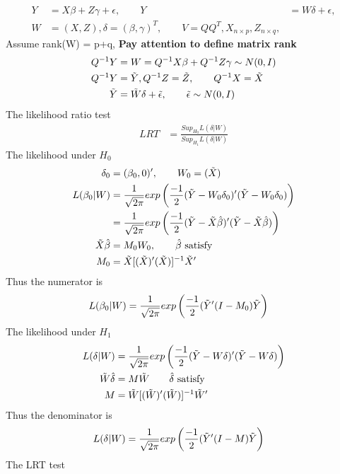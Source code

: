 \documentclass{article}
\begin{document}
\begin{itemize}
\begin{align*}
Y &= X\beta + Z\gamma + \epsilon, \qquad Y&= W\delta + \epsilon, \\
W &= (X, Z), \delta = (\beta, \gamma)^T, \qquad V = Q Q^{T}, X_{n \times p}, Z_{n \times q}, 
\end{align*}
Assume rank(W) = p+q, \textbf{Pay attention to define matrix rank}
\begin{align*}
Q^{-1}Y &= W = Q^{-1}X \beta + Q^{-1}Z \gamma \sim N(0, I) \\
Q^{-1}Y &= \Tilde{Y}, Q^{-1}Z = \Tilde{Z}, \qquad Q^{-1}X = \Tilde{X}\\
\Tilde{Y} &= \Tilde{W} \delta + \Tilde{\epsilon},  \qquad \Tilde{\epsilon} \sim N(0,I)
\end{align*}
The likelihood ratio test
\begin{align*}
LRT &= \frac{Sup_{H_0} L(\delta| W)}{Sup_{H_1}L(\delta| W)} 
\end{align*}
The likelihood under $H_0$
\begin{align*}
\delta_0 &= (\beta_0, 0)', \qquad W_0 = (\Tilde{X}) \\
L(\beta_0|W) &=\frac{1}{\sqrt{2\pi}} exp \left(\frac{-1}{2} (\Tilde{Y} - W_0\delta_0)'(\Tilde{Y} - W_0\delta_0) \right) \\
&= \frac{1}{\sqrt{2\pi}} exp \left(\frac{-1}{2} (\Tilde{Y} - \Tilde{X}\hat{\beta})'(\Tilde{Y} - \Tilde{X}\hat{\beta}) \right)\\
\Tilde{X}\hat{\beta} &= M_0 W_0, \qquad \hat{\beta} \text{ satisfy}\\
M_0 &= \Tilde{X}[(\Tilde{X})'(\Tilde{X})]^{-1}\Tilde{X}' 
\end{align*}
Thus the numerator is 
\begin{align*}
L(\beta_0|W) &= \frac{1}{\sqrt{2\pi}} exp \left(\frac{-1}{2} (\Tilde{Y}' (I- M_0) \Tilde{Y} \right)
\end{align*}
The likelihood under $H_1$
\begin{align*}
L(\delta|W) &=\frac{1}{\sqrt{2\pi}} exp \left(\frac{-1}{2} (\Tilde{Y} - W\delta)'(\Tilde{Y} - W\delta) \right)\\
\Tilde{W} \hat{\delta} &= M \Tilde{W} \qquad \hat{\delta} \text{ satisfy}\\
M &= \Tilde{W}[(\Tilde{W})'(\Tilde{W})]^{-1}\Tilde{W}' 
\end{align*}
Thus the denominator is 
\begin{align*}
L(\delta|W) &= \frac{1}{\sqrt{2\pi}} exp \left(\frac{-1}{2} (\Tilde{Y}' (I- M) \Tilde{Y} \right)
\end{align*}
The LRT test 
\begin{align*}

\end{align*}
\end{itemize}
\end{document}
